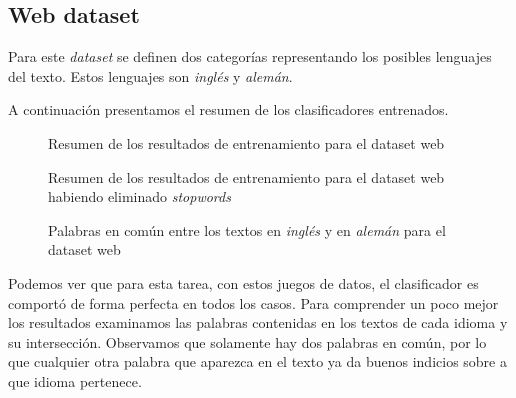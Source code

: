 \documentclass[a4paper,10pt]{article}
\begin{document}
\subsection{\textsf{Web} dataset}

Para este \emph{dataset} se definen dos categorías representando los posibles lenguajes del texto. Estos lenguajes son \emph{inglés} y \emph{alemán}.

A continuación presentamos el resumen de los clasificadores entrenados.

%    
%    

\begin{multicols}{2}
\begin{figure}[H]
    \centering
    \begin{minipage}{0.35\textwidth}
    
    \end{minipage}
    \caption{Resumen de los resultados de entrenamiento para el dataset \textsf{web}}
\end{figure}
\begin{figure}[H]
    \centering
    \begin{minipage}{0.35\textwidth}
    
    \end{minipage}
    \caption{Resumen de los resultados de entrenamiento para el dataset \textsf{web} habiendo eliminado \emph{stopwords}}
\end{figure}
\end{multicols}


\begin{minipage}[c]{\textwidth}

\begin{wrapfigure}{l}{0.3\textwidth}
\centering

\caption{Palabras en común entre los textos en \emph{inglés} y en \emph{alemán} para el dataset \textsf{web}}
\end{wrapfigure}
   
Podemos ver que para esta tarea, con estos juegos de datos, el clasificador es comportó de forma perfecta en todos los casos. Para comprender un poco mejor los resultados examinamos las palabras contenidas en los textos de cada idioma y su intersección. Observamos que solamente hay dos palabras en común, por lo que cualquier otra palabra que aparezca en el texto ya da buenos indicios sobre a que idioma pertenece.
\end{minipage}
\end{document}
